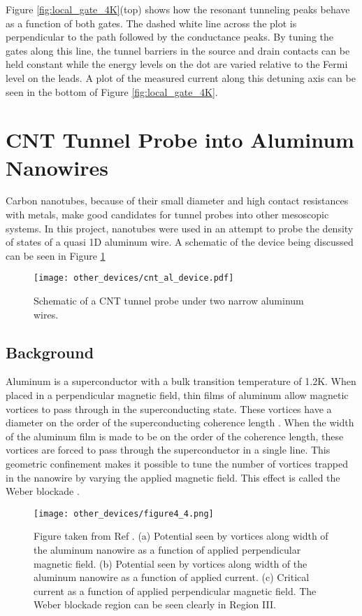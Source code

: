 Figure \ref{fig:local_gate_4K}(top) shows how the resonant tunneling peaks behave as a function of both gates. The dashed white line across the plot is perpendicular to the path followed by the conductance peaks. By tuning the gates along this line, the tunnel barriers in the source and drain contacts can be held constant while the energy levels on the dot are varied relative to the Fermi level on the leads. A plot of the measured current along this detuning axis can be seen in the bottom of Figure \ref{fig:local_gate_4K}.

\section{CNT Tunnel Probe into Aluminum Nanowires}

Carbon nanotubes, because of their small diameter and high contact resistances with metals, make good candidates for tunnel probes into other mesoscopic systems. In this project, nanotubes were used in an attempt to probe the density of states of a quasi 1D aluminum wire. A schematic of the device being discussed can be seen in Figure \ref{fig:cnt_al_device}

\begin{figure}
    \centering
    \texttt{[image: other\_devices/cnt\_al\_device.pdf]}
    \caption{Schematic of a CNT tunnel probe under two narrow aluminum wires.}
    \label{fig:cnt_al_device}
\end{figure}

\subsection{Background}

Aluminum is a superconductor with a bulk transition temperature of 1.2K. When placed in a perpendicular magnetic field, thin films of aluminum allow magnetic vortices to pass through in the superconducting state. These vortices have a diameter on the order of the superconducting coherence length \cite{Tinkham1996}. When the width of the aluminum film is made to be on the order of the coherence length, these vortices are forced to pass through the superconductor in a single line. This geometric confinement makes it possible to tune the number of vortices trapped in the nanowire by varying the applied magnetic field. This effect is called the Weber blockade \cite{Pekker2011}.

\begin{figure}
    \centering
    \texttt{[image: other\_devices/figure4\_4.png]}
    \caption{Figure taken from Ref \cite{Morgan-Wall2015}. (a) Potential seen by vortices along width of the aluminum nanowire as a function of applied perpendicular magnetic field. (b) Potential seen by vortices along width of the aluminum nanowire as a function of applied current. (c) Critical current as a function of applied perpendicular magnetic field. The Weber blockade region can be seen clearly in Region III.}
    \label{fig:aluminum_potential}
\end{figure}

